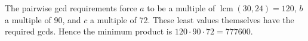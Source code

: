 The pairwise gcd requirements force $a$ to be a multiple of $\operatorname{lcm}(30,24)=120$, $b$ a multiple of 90, and $c$ a multiple of 72. These least values themselves have the required gcds. Hence the minimum product is $120\cdot90\cdot72=\boxed{777600}$.
